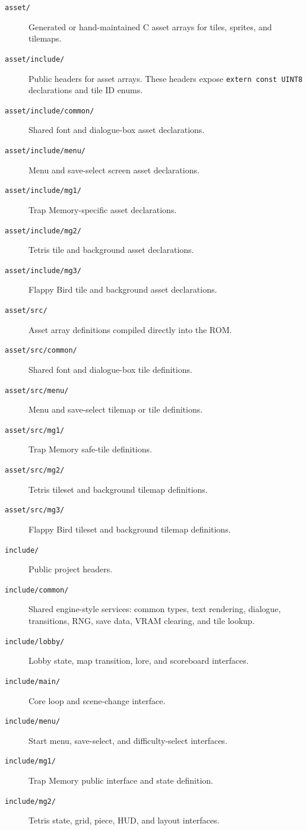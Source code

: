 \begin{description}
  \item[\texttt{asset/}] Generated or hand-maintained C asset arrays for tiles, sprites, and tilemaps.
  \item[\texttt{asset/include/}] Public headers for asset arrays. These headers expose \texttt{extern const UINT8} declarations and tile ID enums.
  \item[\texttt{asset/include/common/}] Shared font and dialogue-box asset declarations.
  \item[\texttt{asset/include/menu/}] Menu and save-select screen asset declarations.
  \item[\texttt{asset/include/mg1/}] Trap Memory-specific asset declarations.
  \item[\texttt{asset/include/mg2/}] Tetris tile and background asset declarations.
  \item[\texttt{asset/include/mg3/}] Flappy Bird tile and background asset declarations.
  \item[\texttt{asset/src/}] Asset array definitions compiled directly into the ROM.
  \item[\texttt{asset/src/common/}] Shared font and dialogue-box tile definitions.
  \item[\texttt{asset/src/menu/}] Menu and save-select tilemap or tile definitions.
  \item[\texttt{asset/src/mg1/}] Trap Memory safe-tile definitions.
  \item[\texttt{asset/src/mg2/}] Tetris tileset and background tilemap definitions.
  \item[\texttt{asset/src/mg3/}] Flappy Bird tileset and background tilemap definitions.
  \item[\texttt{include/}] Public project headers.
  \item[\texttt{include/common/}] Shared engine-style services: common types, text rendering, dialogue, transitions, RNG, save data, VRAM clearing, and tile lookup.
  \item[\texttt{include/lobby/}] Lobby state, map transition, lore, and scoreboard interfaces.
  \item[\texttt{include/main/}] Core loop and scene-change interface.
  \item[\texttt{include/menu/}] Start menu, save-select, and difficulty-select interfaces.
  \item[\texttt{include/mg1/}] Trap Memory public interface and state definition.
  \item[\texttt{include/mg2/}] Tetris state, grid, piece, HUD, and layout interfaces.

\end{description}

